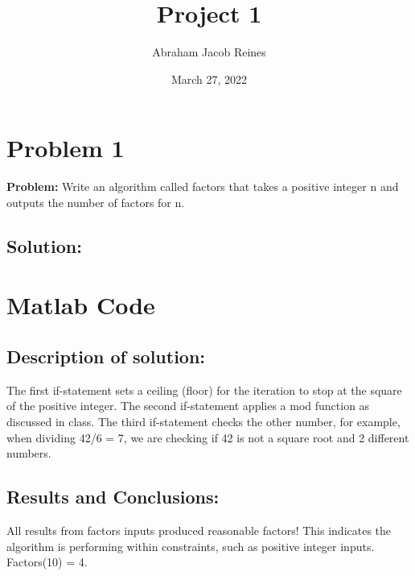 \documentclass[12pt]{article} %
\title{{\bf {Project 1}}}
\author{Abraham Jacob Reines}
\date{March 27, 2022} %
\begin{document}
\maketitle
\hfill
\newpage

\section{Problem 1}
{\bf{Problem:}}
Write an algorithm called factors that takes a positive integer n and outputs the number of factors for n. 

\subsection{Solution:}




\section*{Matlab Code}



%

\subsection{Description of solution:}
The first if-statement sets a ceiling (floor) for the iteration to stop at the square of the positive integer.  The second if-statement applies a mod function as discussed in class.  The third if-statement checks the other number, for example, when dividing 42/6 = 7, we are checking if 42 is not a square root and 2 different numbers. 

\subsection{Results and Conclusions:}
All results from factors inputs produced reasonable factors! This indicates the algorithm is performing within constraints, such as positive integer inputs.  
Factors(10) = 4.
\end{document}
